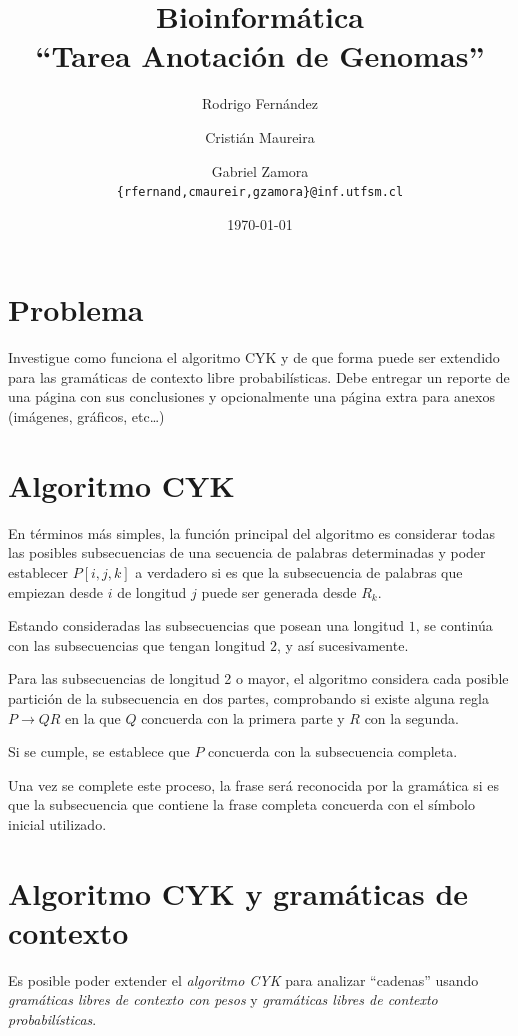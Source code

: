 \documentclass[letter, 10pt]{article}
\begin{document}


\title{Bioinformática\\``Tarea Anotación de Genomas''}
\author{Rodrigo Fernández \and Cristián Maureira \and Gabriel Zamora\\\texttt{\{rfernand,cmaureir,gzamora\}@inf.utfsm.cl}}
\date{\today}
\maketitle

\section{Problema}
Investigue como funciona el algoritmo CYK y de que
forma puede ser extendido para las gramáticas de contexto
libre probabilísticas. Debe entregar un reporte de una
página con sus conclusiones y opcionalmente una página
extra para anexos (imágenes, gráficos, etc…)

\section{Algoritmo CYK}
En términos más simples, la función principal del algoritmo es considerar todas las posibles
subsecuencias de una secuencia de palabras determinadas y poder establecer $P[i, j, k]$ a verdadero
si es que la subsecuencia de palabras que empiezan desde $i$ de longitud $j$ puede ser generada desde $R_k$.

Estando consideradas las subsecuencias que posean una longitud $1$, se
continúa con las subsecuencias que tengan longitud $2$, y así sucesivamente.

Para las subsecuencias de longitud 2 o mayor, el algoritmo considera cada posible
partición de la subsecuencia en dos partes, comprobando si existe alguna regla $P \rightarrow Q R$
en la que $Q$ concuerda con la primera parte y $R$ con la segunda.

Si se cumple, se establece que $P$ concuerda con la subsecuencia completa.

Una vez se complete este proceso,
la frase será reconocida por la gramática si es que la subsecuencia que contiene la frase completa concuerda
con el símbolo inicial utilizado.

\section{Algoritmo CYK y gramáticas de contexto}
Es posible poder extender el \emph{algoritmo CYK} para analizar ``cadenas'' usando
\emph{gramáticas libres de contexto con pesos} y \emph{gramáticas libres de contexto
probabilísticas}.
\end{document}
